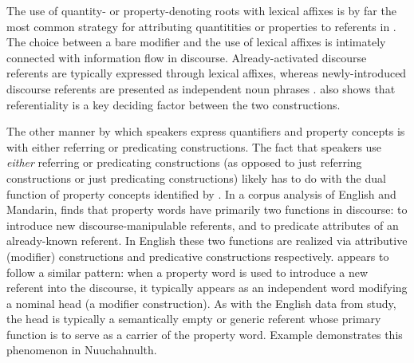 \noindent The use of quantity- or property-denoting roots with lexical affixes is by far the most common strategy for attributing quantitities or properties to referents in . The choice between a bare modifier and the use of lexical affixes is intimately connected with information flow in discourse. Already-activated discourse referents are typically expressed through lexical affixes, whereas newly-introduced discourse referents are presented as independent noun phrases \parencite[887--889]{Mithun1984}. \textcite[144]{Nakayama2001} also shows that referentiality is a key deciding factor between the two constructions.

The other manner by which speakers express quantifiers and property concepts is with either referring or predicating constructions. The fact that speakers use \emph{either} referring or predicating constructions (as opposed to just referring constructions or just predicating constructions) likely has to do with the dual function of property concepts identified by \textcite{Thompson1989}. In a corpus analysis of English and Mandarin, \citeauthor{Thompson1989} finds that property words have primarily two functions in discourse: to introduce new discourse-manipulable referents, and to predicate attributes of an already-known referent. In English these two functions are realized via attributive (modifier) constructions and predicative constructions respectively.  appears to follow a similar pattern: when a property word is used to introduce a new referent into the discourse, it typically appears as an independent word modifying a nominal head (a modifier construction). As with the English data from  study, the head is typically a semantically empty or generic referent whose primary function is to serve as a carrier of the property word. Example  demonstrates this phenomenon in Nuuchahnulth.

